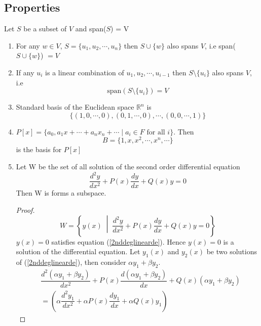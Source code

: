 \documentclass[a4paper, titlepage]{article}
\begin{document}
    \subsection{Properties}
        Let $S$ be a subset of $V$ and span($S$) = V
        \begin{enumerate}
            \item For any $w \in V$, $S = \{ u_1, u_2, \cdots, u_n \}$
            then $S \cup \{ w \}$ also spans $V$, i.e span($S \cup \{ w \}$) $= V$
            \item If any $u_i$ is a linear combination of $u_1, u_2,
            \cdots, u_{i-1}$ then $S \setminus \{u_i\}$ also spans $V$, i.e
            $$\text{span}\left( S\setminus \{ u_i \} \right) = V$$
            \item Standard basis of the Euclidean space $\mathbb{R}^n$
            is \[
                    \{
                    (1, 0 , \cdots, 0),
                    (0, 1 , \cdots, 0),
                    \cdots,
                    (0, 0 , \cdots, 1)
                    \}
            \]
            \item $P[x] = \{ a_0, a_1x + \cdots + a_nx_n + \cdots \; \vert \; a_i \in F \text{ for all }i \}$.
            Then $$B = \{ 1, x, x^2, \cdots, x^n, \cdots \}$$
            is the basis for $P[x]$
            \item Let W be the set of all solution of the second order differential
            equation 
            \begin{equation}
                \label{2nddeglinearde}
                \dfrac{d^2y}{dx^2} + P(x)\dfrac{dy}{dx} + Q(x)y = 0
            \end{equation}
            Then W is forms a subspace.
            \begin{proof}
                $$W = \left\{ y(x) \; \middle| \; \dfrac{d^2y}{dx^2} + P(x)\dfrac{dy}{dx} + Q(x)y = 0 \right\}$$
                $y(x) = 0$ satisfies equation (\ref{2nddeglinearde}). Hence
                $y(x) = 0$ is a solution of the differential equation.
                Let $y_1(x)$ and $y_2(x)$ be two solutions of (\ref{2nddeglinearde}),
                then consider $\alpha y_1 + \beta y_2$.
                \begin{align*}
                    &\dfrac{d^2(\alpha y_1 + \beta y_2)}{dx^2} + P(x)\dfrac{d(\alpha y_1 + \beta y_2)}{dx} + Q(x)(\alpha y_1 + \beta y_2) \\
                    &= \left( \alpha\dfrac{d^2y_1}{dx^2} + \alpha P(x)\dfrac{dy_1}{dx} + \alpha Q(x)y_1 \right)

\end{align*}
\end{proof}
\end{enumerate}
\end{document}
